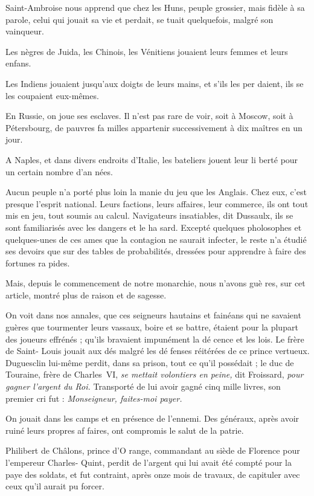 Saint-Ambroise nous apprend que
chez les Huns, peuple grossier, mais
fidèle à sa parole, celui qui jouait sa
vie et perdait, se tuait quelquefois,
malgré son vainqueur.

Les nègres de Juida, les Chinois,
les Vénitiens jouaient leurs femmes
et leurs enfans.

Les Indiens jouaient jusqu'aux
doigts de leurs mains, et s'ils les per%
daient, ils se les coupaient eux-mêmes.

En Russie, on joue ses esclaves. Il
n'est pas rare de voir, soit à Moscow,
soit à Pétersbourg, de pauvres fa%
milles appartenir successivement à
dix maîtres en un jour.

A Naples, et dans divers endroits
d'Italie, les bateliers jouent leur li%
berté pour un certain nombre d'an%
nées.

Aucun peuple n'a porté plus loin
la manie du jeu que les Anglais. Chez
eux, c'est presque l'esprit national.
Leurs factions, leurs affaires, leur
commerce, ils ont tout mis en jeu,
tout soumis au calcul. Navigateurs
insatiables, dit Dussaulx, ils se sont
familiarisés avec les dangers et le ha%
sard. Excepté quelques pholosophes
et quelques-unes de ces ames que la
contagion ne saurait infecter, le reste
n'a étudié ses devoirs que sur des
tables de probabilités, dressées pour
apprendre à faire des fortunes ra%
pides.

Mais, depuis le commencement de
notre monarchie, nous n'avons guè%
res, sur cet article, montré plus de
raison et de sagesse.

On voit dans nos annales, que ces
seigneurs hautains et fainéans qui ne
savaient guères que tourmenter leurs
vassaux, boire et se battre, étaient
pour la plupart des joueurs effrénés ;
qu'ils bravaient impunément la dé%
cence et les lois. Le frère de Saint-%
Louis jouait aux dés malgré les dé%
fenses réitérées de ce prince vertueux.
Duguesclin lui-même perdit, dans sa
prison, tout ce qu'il possédait ; le
duc de Touraine, frère de Charles~VI,
\emph{se mettait volontiers en peine,} dit
Froissard, \emph{pour gagner l'argent du
Roi.} Transporté de lui avoir gagné
cinq mille livres, son premier cri fut :
\emph{Monseigneur, faites-moi payer.}

On jouait dans les camps et en
présence de l'ennemi. Des généraux,
après avoir ruiné leurs propres af%
faires, ont compromis le salut de la
patrie.

Philibert de Châlons, prince d'O%
range, commandant au siède de
Florence pour l'empereur Charles-%
Quint, perdit de l'argent qui lui avait
été compté pour la paye des soldats,
et fut contraint, après onze mois de
travaux, de capituler avec ceux qu'il
aurait pu forcer.

